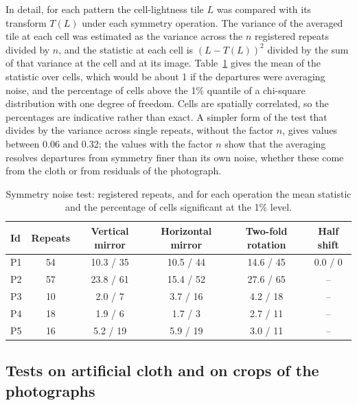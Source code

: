 \documentclass[12pt]{article}
\begin{document}
In detail, for each pattern the cell-lightness tile $L$ was compared with its transform $T(L)$ under each symmetry operation. The variance of the averaged tile at each cell was estimated as the variance across the $n$ registered repeats divided by $n$, and the statistic at each cell is $(L - T(L))^2$ divided by the sum of that variance at the cell and at its image. Table~\ref{tab:symnoise} gives the mean of the statistic over cells, which would be about 1 if the departures were averaging noise, and the percentage of cells above the 1\% quantile of a chi-square distribution with one degree of freedom. Cells are spatially correlated, so the percentages are indicative rather than exact. A simpler form of the test that divides by the variance across single repeats, without the factor $n$, gives values between 0.06 and 0.32; the values with the factor $n$ show that the averaging resolves departures from symmetry finer than its own noise, whether these come from the cloth or from residuals of the photograph.

\begin{table}[htbp]
\centering\small
\caption{Symmetry noise test: registered repeats, and for each operation the mean statistic and the percentage of cells significant at the 1\% level.}
\label{tab:symnoise}
\begin{tabular}{lccccc}
Id & Repeats & Vertical mirror & Horizontal mirror & Two-fold rotation & Half shift \\
\midrule
P1 & 54 & 10.3 / 35 & 10.5 / 44 & 14.6 / 45 & 0.0 / 0 \\
P2 & 57 & 23.8 / 61 & 15.4 / 52 & 27.6 / 65 & -- \\
P3 & 10 & 2.0 / 7 & 3.7 / 16 & 4.2 / 18 & -- \\
P4 & 18 & 1.9 / 6 & 1.7 / 3 & 2.7 / 11 & -- \\
P5 & 16 & 5.2 / 19 & 5.9 / 19 & 3.0 / 11 & -- \\
\end{tabular}
\end{table}
\subsection{Tests on artificial cloth and on crops of the photographs}
\end{document}
